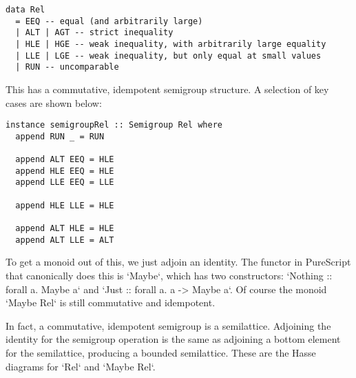 \documentclass[11pt, twoside, reqno]{book}
\begin{document}
\begin{verbatim}
data Rel
  = EEQ -- equal (and arbitrarily large)
  | ALT | AGT -- strict inequality
  | HLE | HGE -- weak inequality, with arbitrarily large equality
  | LLE | LGE -- weak inequality, but only equal at small values
  | RUN -- uncomparable
\end{verbatim}

This has a commutative, idempotent semigroup structure.
A selection of key cases are shown below:
\begin{verbatim}
instance semigroupRel :: Semigroup Rel where
  append RUN _ = RUN

  append ALT EEQ = HLE
  append HLE EEQ = HLE
  append LLE EEQ = LLE

  append HLE LLE = HLE

  append ALT HLE = HLE
  append ALT LLE = ALT
\end{verbatim}

To get a monoid out of this, we just adjoin an identity.
The functor in PureScript that canonically does this is \inHS`Maybe`, which has two constructors: \inHS`Nothing :: forall a. Maybe a` and \inHS`Just :: forall a. a -> Maybe a`.
Of course the monoid \inHS`Maybe Rel` is still commutative and idempotent.

In fact, a commutative, idempotent semigroup is a semilattice.
Adjoining the identity for the semigroup operation is the same as adjoining a bottom element for the semilattice, producing a bounded semilattice.
These are the Hasse diagrams for \inHS`Rel` and \inHS`Maybe Rel`.
\end{document}
